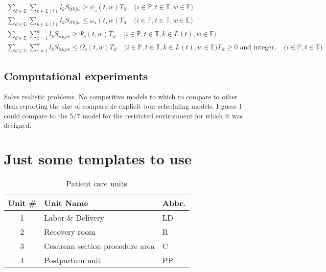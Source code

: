 \documentclass{article}
\begin{document}
\begin{gather}
\sum_{d \in \mathbb{D}}\sum_{k \in L(t)}l_k S_{itkjw} \geq \psi_s(t,w)T_{it} \quad \text{($i \in \mathbb{P},t \in \mathbb{T},w \in \mathbb{E}$)} \label{eqn:S_T_weeklylb_periods} \\
\sum_{d \in \mathbb{D}}\sum_{k \in L(t)}l_k S_{itkjw} \leq \omega_s(t,w)T_{it} \quad \text{($i \in \mathbb{P},t \in \mathbb{T},w \in \mathbb{E}$)} \label{eqn:S_T_weeklyub_periods} \\
%
\sum_{d \in \mathbb{D}}\sum_{z=1}^{w}l_k S_{itkjw} \geq \Psi_s(t,w)T_{it} \quad \text{($i \in \mathbb{P},t \in \mathbb{T},k \in L(t), w \in \mathbb{E}$)} \label{eqn:S_T_cum_weeklylb_periods} \\
\sum_{d \in \mathbb{D}}\sum_{z=1}^{w}l_k S_{itkjw} \leq \Omega_s(t,w)T_{it} \quad \text{($i \in \mathbb{P},t \in \mathbb{T},k \in L(t),w \in \mathbb{E}$)} \label{eqn:S_T_cum_weeklyub_periods} 
T_{it} \geq 0 \text{ and integer}, \quad \text{($i \in \mathbb{P}, t \in \mathbb{T}$)} \label{eqn:TT_int}
\end{gather} 






\subsection{Computational experiments}
\label{sec-computational}

Solve realistic problems. No competitive models to which to compare to other than reporting the size of comparable explicit tour scheduling models. I guess I could compare to the 5/7 model for the restricted environment for which it was designed.

\section{Just some templates to use}


\begin{table}
  \centering
  \caption{Patient care units}\label{table:units}
\begin{tabular}{cll}\hline
 Unit \#       & Unit Name    & Abbr.   \\ \hline
  1       & Labor \& Delivery    & LD    \\
  2       & Recovery room   & R    \\
  3       & Cesarean section procedure area    & C    \\
  4       & Postpartum unit    & PP   \\ \hline  
\end{tabular}
\end{table}
\end{document}
